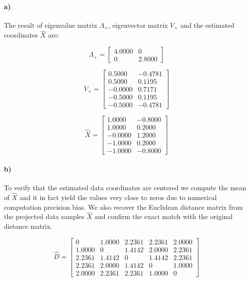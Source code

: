 \documentclass[a4paper]{article}
\begin{document}
\paragraph{a)} The result of eigenvalue matrix $\Lambda_{+}$, eigenvector matrix $V_{+}$ and the estimated coordinates $\hat{X}$ are:

\begin{equation}
	\Lambda_{+} = \begin{bmatrix}
			        4.0000   &      0 \\
         			0  &  2.8000
		\end{bmatrix}
\end{equation}

\begin{equation}
	V_{+} = \begin{bmatrix}
			    0.5000  & -0.4781 \\
			    0.5000  &  0.1195 \\ 
			   -0.0000  &  0.7171 \\
			   -0.5000  &  0.1195 \\
			   -0.5000  & -0.4781
		\end{bmatrix}
\end{equation}

\begin{equation}
	\hat{X} = \begin{bmatrix}
				    1.0000  & -0.8000 \\
				    1.0000  &  0.2000 \\
				   -0.0000  &  1.2000 \\
				   -1.0000  &  0.2000 \\
				   -1.0000  & -0.8000
		\end{bmatrix}
\end{equation}

\paragraph{b)} To verify that the estimated data coordinates are centered we compute the mean of $\hat{X}$ and it in fact yield the values very close to zeros due to numerical computation precision bias. We also recover the Euclidean distance matrix from the projected data samples $\hat{X}$ and confirm the exact match with the original distance matrix.

\begin{equation}
	\hat{D} = \begin{bmatrix}
		        0  &  1.0000  &  2.2361  &  2.2361  &  2.0000 \\
			    1.0000  &       0  &  1.4142  &  2.0000  &  2.2361 \\
			    2.2361  &  1.4142  &       0  &  1.4142  &  2.2361 \\
			    2.2361  &  2.0000  &  1.4142  &       0  &  1.0000 \\
			    2.0000  &  2.2361  &  2.2361  &  1.0000  &       0
		\end{bmatrix}
\end{equation}
\end{document}

